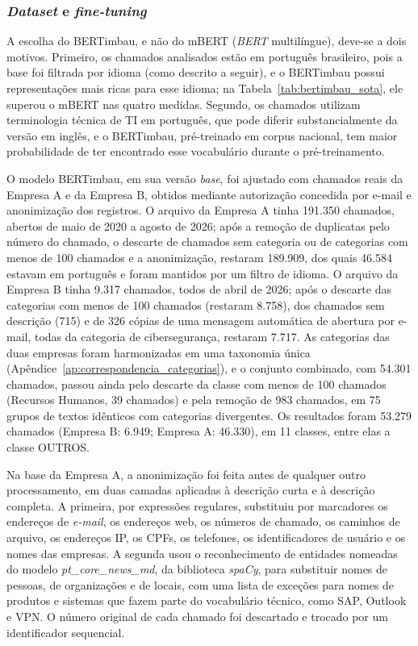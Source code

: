\documentclass[
    12pt,                %
    openright,           %
    oneside,             %
    a4paper,             %
    english,             %
    brazil               %
]{abntex2}
\begin{document}
\subsubsection{\textit{Dataset} e \textit{fine-tuning}}
\label{subsubsec:dataset_finetuning}

A escolha do BERTimbau, e não do mBERT (\textit{BERT} multilíngue), deve-se a dois motivos. Primeiro, os chamados analisados estão em português brasileiro, pois a base foi filtrada por idioma (como descrito a seguir), e o BERTimbau possui representações mais ricas para esse idioma; na Tabela~\ref{tab:bertimbau_sota}, ele superou o mBERT nas quatro medidas. Segundo, os chamados utilizam terminologia técnica de TI em português, que pode diferir substancialmente da versão em inglês, e o BERTimbau, pré-treinado em corpus nacional, tem maior probabilidade de ter encontrado esse vocabulário durante o pré-treinamento.

O modelo BERTimbau, em sua versão \textit{base}, foi ajustado com chamados reais da Empresa A e da Empresa B, obtidos mediante autorização concedida por e-mail e anonimização dos registros. O arquivo da Empresa A tinha 191.350 chamados, abertos de maio de 2020 a agosto de 2026; após a remoção de duplicatas pelo número do chamado, o descarte de chamados sem categoria ou de categorias com menos de 100 chamados e a anonimização, restaram 189.909, dos quais 46.584 estavam em português e foram mantidos por um filtro de idioma. O arquivo da Empresa B tinha 9.317 chamados, todos de abril de 2026; após o descarte das categorias com menos de 100 chamados (restaram 8.758), dos chamados sem descrição (715) e de 326 cópias de uma mensagem automática de abertura por e-mail, todas da categoria de cibersegurança, restaram 7.717. As categorias das duas empresas foram harmonizadas em uma taxonomia única (Apêndice~\ref{ap:correspondencia_categorias}), e o conjunto combinado, com 54.301 chamados, passou ainda pelo descarte da classe com menos de 100 chamados (Recursos Humanos, 39 chamados) e pela remoção de 983 chamados, em 75 grupos de textos idênticos com categorias divergentes. Os resultados foram 53.279 chamados (Empresa B: 6.949; Empresa A: 46.330), em 11 classes, entre elas a classe OUTROS.

Na base da Empresa A, a anonimização foi feita antes de qualquer outro processamento, em duas camadas aplicadas à descrição curta e à descrição completa. A primeira, por expressões regulares, substituiu por marcadores os endereços de \textit{e-mail}, os endereços web, os números de chamado, os caminhos de arquivo, os endereços IP, os CPFs, os telefones, os identificadores de usuário e os nomes das empresas. A segunda usou o reconhecimento de entidades nomeadas do modelo \textit{pt\_core\_news\_md}, da biblioteca \textit{spaCy}, para substituir nomes de pessoas, de organizações e de locais, com uma lista de exceções para nomes de produtos e sistemas que fazem parte do vocabulário técnico, como SAP, Outlook e VPN. O número original de cada chamado foi descartado e trocado por um identificador sequencial.
\end{document}
